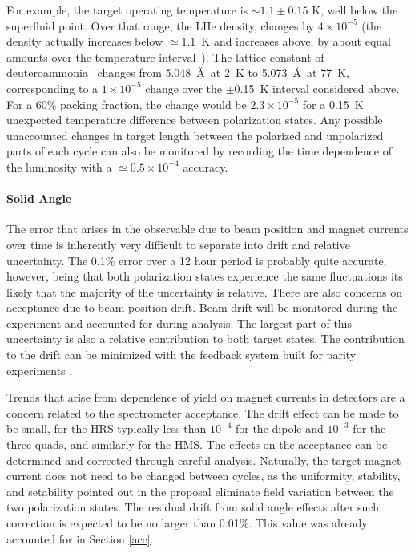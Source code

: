 For example, the target operating temperature is $\sim 1.1\pm 0.15$ K, well below the 
superfluid point.  Over that range, the LHe density, changes by $4\times
10^{-5}$ (the density actually increases below $\simeq 1.1$~K
and increases above, by about equal amounts over the temperature 
interval~\cite{lhe}).
The lattice constant of deuteroammonia~\cite{nd3} changes from 5.048~\AA\ at 2~K to 5.073~\AA\ at 77~K, corresponding to a $1\times 10^{-5}$ change over the 
$\pm$0.15~K interval considered above.  For a 60\% packing fraction, the change 
would be $2.3\times10^{-5}$ for a 0.15~K unexpected temperature difference between
polarization states.
Any possible unaccounted changes in target length between the polarized and 
unpolarized parts of each cycle can also be monitored by recording the time 
dependence of the luminosity with a $\simeq 0.5\times 10^{-4}$ accuracy. %

\paragraph{Solid Angle}\mbox{}

The error that arises in the observable due to beam position and magnet currents
over time is inherently very difficult to separate into drift and relative uncertainty.
The 0.1\% error over a 12 hour period is probably quite accurate, however, being
that both polarization states experience the same fluctuations its likely that the majority
of the uncertainty is relative.  There are also concerns on acceptance due to beam position drift. Beam drift
will be monitored during the experiment and accounted for during analysis.  The largest part of this
uncertainty is also a relative contribution to both target states.  The contribution to the drift can be minimized
with the feedback system built for parity experiments
.

Trends that arise from dependence of yield on
magnet currents in detectors are a concern related to the spectrometer acceptance.  The drift
effect can be made to be small, for the HRS typically less than $10^{-4}$ for the dipole
and $10^{-3}$ for the three quads, and similarly for the HMS.  The effects on the acceptance can be determined and
corrected through careful analysis.  Naturally, the
target magnet current does not need to be changed between cycles, as the uniformity, stability, and setability
pointed out in the proposal eliminate field variation between the two polarization
states.  The residual drift from solid angle effects after such correction is expected to be no larger than 0.01\%.
This value was already accounted for in Section \ref{acc}.

